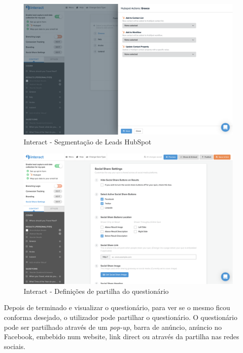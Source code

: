 \begin{figure}[ht!]
	\begin{center}
		\includegraphics[width=1\textwidth]{img/interact/collect2}
		\caption{Interact - Segmentação de Leads HubSpot}
		\label{fig:interact-collect2}
	\end{center}
\end{figure}

\begin{figure}[ht!]
	\begin{center}
		\includegraphics[width=1\textwidth]{img/interact/share}
		\caption{Interact - Definições de partilha do questionário}
		\label{fig:interact-share}
	\end{center}
\end{figure}

\newpage

Depois de terminado e visualizar o questionário, para ver se o mesmo ficou conforma desejado, o utilizador pode partilhar o questionário. O questionário pode ser partilhado através de um \textit{pop-up}, barra de anúncio, anúncio no Facebook, embebido num website, link direct ou através da partilha nas redes sociais. 

